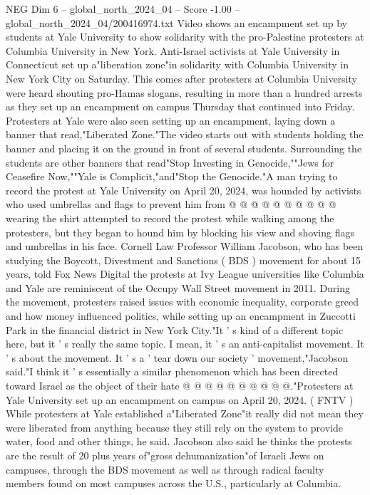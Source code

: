 \begin{textsample}{NEG Dim 6 – global\_north\_2024\_04 – Score -1.00 – global\_north\_2024\_04/200416974.txt}  \label{ex:f6_neg_341}
Video shows an encampment set up by students at Yale University to show solidarity with the pro-Palestine protesters at Columbia University in New York.
Anti-Israel activists at Yale University in Connecticut set up a"liberation zone"in solidarity with Columbia University in New York City on Saturday.
This comes after protesters at Columbia University were heard shouting pro-Hamas slogans, resulting in more than a hundred arrests as they set up an encampment on campus Thursday that continued into Friday.
Protesters at Yale were also seen setting up an encampment, laying down a banner that read,"Liberated Zone."The video starts out with students holding the banner and placing it on the ground in front of several students.
Surrounding the students are other banners that read"Stop Investing in Genocide,""Jews for Ceasefire Now,""Yale is Complicit,"and"Stop the Genocide."A man trying to record the protest at Yale University on April 20, 2024, was hounded by activists who used umbrellas and flags to prevent him from @ @ @ @ @ @ @ @ @ @ wearing the shirt attempted to record the protest while walking among the protesters, but they began to hound him by blocking his view and shoving flags and umbrellas in his face.
Cornell Law Professor William Jacobson, who has been studying the Boycott, Divestment and Sanctions ( BDS ) movement for about 15 years, told Fox News Digital the protests at Ivy League universities like Columbia and Yale are reminiscent of the Occupy Wall Street movement in 2011.
During the movement, protesters raised issues with economic inequality, corporate greed and how money influenced politics, while setting up an encampment in Zuccotti Park in the financial district in New York City."It ' s kind of a different topic here, but it ' s really the same topic.
I mean, it ' s an anti-capitalist movement.
It ' s about the movement.
It ' s a ' tear down our society ' movement,"Jacobson said."I think it ' s essentially a similar phenomenon which has been directed toward Israel as the object of their hate @ @ @ @ @ @ @ @ @ @."Protesters at Yale University set up an encampment on campus on April 20, 2024. ( FNTV ) While protesters at Yale established a"Liberated Zone"it really did not mean they were liberated from anything because they still rely on the system to provide water, food and other things, he said.
Jacobson also said he thinks the protests are the result of 20 plus years of"gross dehumanization"of Israeli Jews on campuses, through the BDS movement as well as through radical faculty members found on most campuses across the U.S., particularly at Columbia.

\end{textsample}
